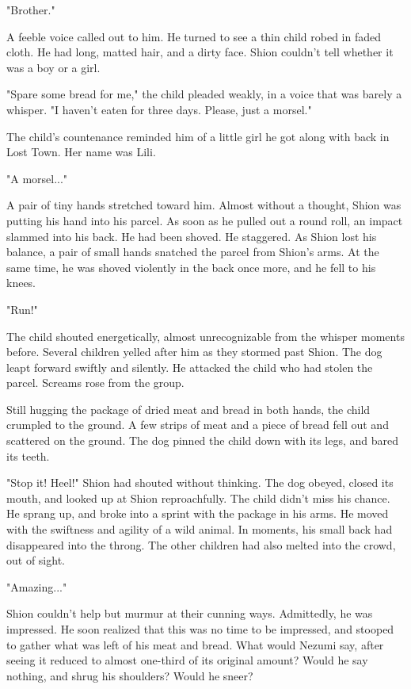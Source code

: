 "Brother."

A feeble voice called out to him. He turned to see a thin child robed in
faded cloth. He had long, matted hair, and a dirty face. Shion couldn't
tell whether it was a boy or a girl.

"Spare some bread for me," the child pleaded weakly, in a voice that was
barely a whisper. "I haven't eaten for three days. Please, just a
morsel."

The child's countenance reminded him of a little girl he got along with
back in Lost Town. Her name was Lili.

"A morsel..."

A pair of tiny hands stretched toward him. Almost without a thought,
Shion was putting his hand into his parcel. As soon as he pulled out a
round roll, an impact slammed into his back. He had been shoved. He
staggered. As Shion lost his balance, a pair of small hands snatched the
parcel from Shion's arms. At the same time, he was shoved violently in
the back once more, and he fell to his knees.

"Run!"

The child shouted energetically, almost unrecognizable from the whisper
moments before. Several children yelled after him as they stormed past
Shion. The dog leapt forward swiftly and silently. He attacked the child
who had stolen the parcel. Screams rose from the group.

Still hugging the package of dried meat and bread in both hands, the
child crumpled to the ground. A few strips of meat and a piece of bread
fell out and scattered on the ground. The dog pinned the child down with
its legs, and bared its teeth.

"Stop it! Heel!" Shion had shouted without thinking. The dog obeyed,
closed its mouth, and looked up at Shion reproachfully. The child didn't
miss his chance. He sprang up, and broke into a sprint with the package
in his arms. He moved with the swiftness and agility of a wild animal.
In moments, his small back had disappeared into the throng. The other
children had also melted into the crowd, out of sight.

"Amazing..."

Shion couldn't help but murmur at their cunning ways. Admittedly, he was
impressed. He soon realized that this was no time to be impressed, and
stooped to gather what was left of his meat and bread. What would Nezumi
say, after seeing it reduced to almost one-third of its original amount?
Would he say nothing, and shrug his shoulders? Would he sneer?

